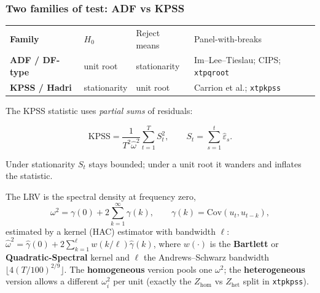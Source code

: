 \documentclass[11pt,a4paper]{article}
\newcommand{\cmd}[1]{\texttt{\textcolor{camber}{#1}}}
\newcommand{\hlt}[2]{\textcolor{#1}{\textbf{#2}}}
\theoremstyle{definition}
\begin{document}
\subsubsection{Two families of test: ADF vs KPSS}
\begin{center}
\begin{tabular}{@{}>{\bfseries}l l l l@{}}
\rowcolor{cteal}\color{white}Family & \color{white}$H_0$ & \color{white}Reject means & \color{white}Panel-with-breaks\\
ADF / DF-type & unit root & stationarity & Im--Lee--Tieslau; CIPS; \cmd{xtpqroot}\\
KPSS / Hadri & stationarity & unit root & Carrion et al.; \cmd{xtpkpss}\\
\end{tabular}
\end{center}
The KPSS statistic uses \emph{partial sums} of residuals:
\begin{eqbox}
\[
\text{KPSS}=\frac{1}{T^2\hat\omega^2}\sum_{t=1}^{T}S_t^2,\qquad S_t=\sum_{s=1}^{t}\hat\varepsilon_s .
\]
\end{eqbox}
Under stationarity $S_t$ stays bounded; under a unit root it wanders and inflates the statistic.

\begin{definition}
The LRV is the spectral density at frequency zero,
\[
\omega^2=\gamma(0)+2\sum_{k=1}^{\infty}\gamma(k),\qquad \gamma(k)=\mathrm{Cov}(u_t,u_{t-k}),
\]
estimated by a kernel (HAC) estimator with bandwidth $\ell$:
$\hat\omega^2=\hat\gamma(0)+2\sum_{k=1}^{\ell}w(k/\ell)\hat\gamma(k)$, where $w(\cdot)$ is the
\hlt{ccyan}{Bartlett} or \hlt{ccyan}{Quadratic-Spectral} kernel and $\ell$ the Andrews--Schwarz
bandwidth $\lfloor 4(T/100)^{2/9}\rfloor$. The \hlt{cblue}{homogeneous} version pools one $\omega^2$;
the \hlt{cblue}{heterogeneous} version allows a different $\omega_i^2$ per unit (exactly the
$Z_{\mathrm{hom}}$ vs $Z_{\mathrm{het}}$ split in \cmd{xtpkpss}).
\end{definition}
\end{document}
